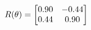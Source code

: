 \documentclass[preview]{standalone}
\begin{document}
\begin{align*}
\special{dvisvgm:raw <g id='unique000'>}R(\theta) = \begin{bmatrix}0.90 & -0.44\\0.44 & 0.90\end{bmatrix}\special{dvisvgm:raw </g>}
\end{align*}
\end{document}
